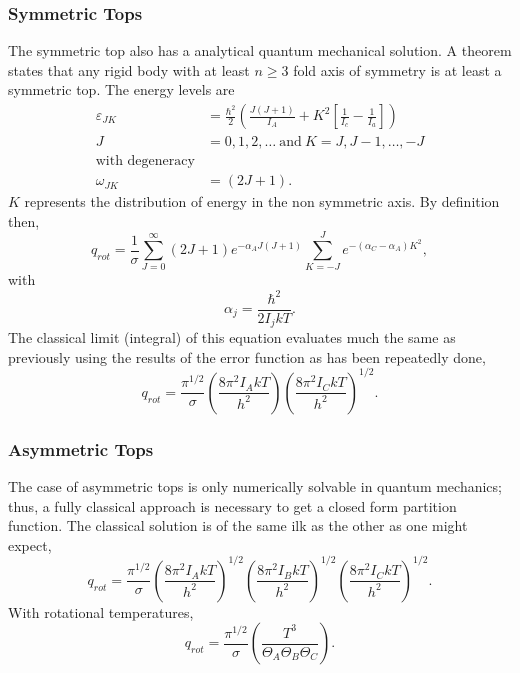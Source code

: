 \subsubsection{Symmetric Tops}
The symmetric top also has a analytical quantum mechanical solution. A theorem
states that any rigid body with at least $n \ge 3$ fold axis of symmetry is at
least a symmetric top. The energy levels are
\begin{align*}
	\varepsilon_{JK} &= \frac{\hbar^2}{2}
	{\left( \frac{J(J+1)}{I_A} + K^2
	{\left[\frac{1}{I_c} - \frac{1}{I_{a}}\right]}
	\right)}\\
	J &= 0,1,2,\ldots
	~\text{and}~K = J, J-1, \ldots, -J\\
	\text{with degeneracy}\\
	\omega_{JK} &= (2J+1).
\end{align*}
$K$ represents the distribution of energy in the non symmetric axis. By
definition then,
\begin{equation*}
	q_{rot} = \frac{1}{\sigma}
	\sum_{J=0}^{\infty}{(2J+1) e^{-\alpha_A J(J+1)}}
	\sum_{K=-J}^{J}{e^{-(\alpha_C - \alpha_{A})K^2}},
\end{equation*}
with
\begin{equation*}
	\alpha_j = \frac{\hbar^2}{2I_j kT}.
\end{equation*}
The classical limit (integral) of this equation evaluates much the same as
previously using the results of the error function as has been repeatedly done,
\begin{equation*}
	q_{rot} = \frac{\pi^{1/2}}{\sigma}
	{\left(\frac{8\pi^2 I_A kT}{h^2}\right)}
	{\left(\frac{8\pi^2 I_C kT}{h^2}\right)}^{1/2}.
\end{equation*}
\subsubsection{Asymmetric Tops}
The case of asymmetric tops is only numerically solvable in quantum mechanics;
thus, a fully classical approach is necessary to get a closed form partition
function. The classical solution is of the same ilk as the other as one
might expect,
\begin{equation*}
	q_{rot} = \frac{\pi^{1/2}}{\sigma}
	{\left(\frac{8\pi^2 I_A kT}{h^2}\right)}^{1/2}
	{\left(\frac{8\pi^2 I_B kT}{h^2}\right)}^{1/2}
	{\left(\frac{8\pi^2 I_C kT}{h^2}\right)}^{1/2}.
\end{equation*}
With rotational temperatures,
\begin{equation*}
	q_{rot} = \frac{\pi^{1/2}}{\sigma}
	{\left(\frac{T^3}{\Theta_A \Theta_B \Theta_{C}}\right)}.
\end{equation*}

